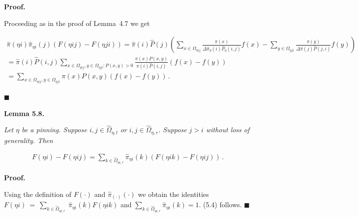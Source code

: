 \par\medskip\noindent\textbf{Proof.}\par



Proceeding as in the proof of Lemma 4.7 we get\par


\[\begin{gathered}
\displaystyle\hat{\pi}(\eta i)\hat{\pi}_{\eta i}(j)(F(\eta ij)-F(\eta ji)) \displaystyle=\hat{\pi}(i)\hat{P}(j)\left(\sum_{x\in\Omega_{\eta ij}}\frac{\pi(x)}{\Delta\hat{\pi}_{\eta}(i)\hat{P}_{\eta}(i,j)}f(x)-\sum_{y\in\Omega_{\eta ji}}\frac{\pi(y)}{\Delta\hat{\pi}(j)\hat{P}(j,i)}f(y)\right) \\
\displaystyle=\hat{\pi}(i)\hat{P}(i,j)\sum_{x\in\Omega_{\eta ij},y\in\Omega_{\eta ji}:P(x,y)>0}\frac{\pi(x)P(x,y)}{\hat{\pi}(i)\hat{P}(i,j)}(f(x)-f(y)) \\
\displaystyle=\sum_{x\in\Omega_{\eta ij},y\in\Omega_{\eta ji}}\pi(x)P(x,y)(f(x)-f(y))\,.
\end{gathered}\]


\ensuremath{\blacksquare}\par






\par\medskip\noindent\textbf{\textbf{Lemma 5.8}\textbf{.}}\par



\emph{Let $\eta$ be a pinning. Suppose $i,j\in\hat{\Omega}_{\eta,l}$ or $i,j\in\hat{\Omega}_{\eta,r}$. Suppose $j>i$ without loss of generality. Then}\par


\[\begin{gathered}
\displaystyle F(\eta i)-F(\eta ij) \displaystyle=\sum_{k\in\hat{\Omega}_{\eta i,r}}\hat{\pi}_{\eta i}(k)(F(\eta ik)-F(\eta ij))\,.
\end{gathered}\]






\par\medskip\noindent\textbf{Proof.}\par



Using the definition of $F(\cdot)$ and $\hat{\pi}_{(\cdot)}(\cdot)$ we obtain the identities
$F(\eta i)~=~\sum_{k\in\hat{\Omega}_{\eta i,r}}~\hat{\pi}_{\eta i}(k)F(\eta ik)$
and $\sum_{k\in\hat{\Omega}_{\eta i,r}}\hat{\pi}_{\eta i}(k)=1$. (5.4) follows.
\ensuremath{\blacksquare}\par





